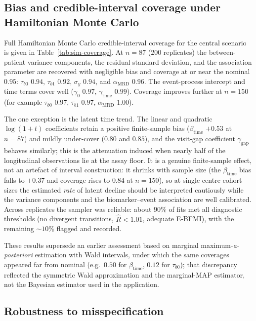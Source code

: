 \documentclass[11pt]{article}
\begin{document}
\subsection{Bias and credible-interval coverage under Hamiltonian Monte Carlo}
\label{sec:sim:coverage}

Full Hamiltonian Monte Carlo credible-interval coverage for the central
scenario is given in Table~\ref{tab:sim-coverage}. At $n=87$ (200 replicates)
the between-patient variance components, the residual standard deviation, and
the association parameter are recovered with negligible bias and coverage at or
near the nominal $0.95$: $\tau_{b0}$ $0.94$, $\tau_{b1}$ $0.92$, $\sigma_y$
$0.94$, and $\alpha_{\mathrm{MRD}}$ $0.96$. The event-process intercept and time
terms cover well ($\gamma_0$ $0.97$, $\gamma_{\mathrm{time}}$ $0.99$). Coverage
improves further at $n=150$ (for example $\tau_{b0}$ $0.97$, $\tau_{b1}$
$0.97$, $\alpha_{\mathrm{MRD}}$ $1.00$).

The one exception is the latent time trend. The linear and quadratic
$\log(1+t)$ coefficients retain a positive finite-sample bias
($\beta_{\mathrm{time}}$ $+0.53$ at $n=87$) and mildly under-cover ($0.80$ and
$0.85$), and the visit-gap coefficient $\gamma_{\mathrm{gap}}$ behaves
similarly; this is the attenuation induced when nearly half of the longitudinal
observations lie at the assay floor. It is a genuine finite-sample effect, not
an artefact of interval construction: it shrinks with sample size (the
$\beta_{\mathrm{time}}$ bias falls to $+0.37$ and coverage rises to $0.84$ at
$n=150$), so at single-centre cohort sizes the estimated \emph{rate} of latent
decline should be interpreted cautiously while the variance components and the
biomarker--event association are well calibrated. Across replicates the sampler
was reliable: about $90\%$ of fits met all diagnostic thresholds (no divergent
transitions, $\widehat R<1.01$, adequate E-BFMI), with the remaining $\sim10\%$
flagged and recorded.

These results supersede an earlier assessment based on marginal
maximum-\emph{a-posteriori} estimation with Wald intervals, under which the same
coverages appeared far from nominal (e.g.\ $0.50$ for $\beta_{\mathrm{time}}$,
$0.12$ for $\tau_{b0}$); that discrepancy reflected the symmetric Wald
approximation and the marginal-MAP estimator, not the Bayesian estimator used in
the application.



\subsection{Robustness to misspecification}
\label{sec:sim:misspec}
\end{document}
